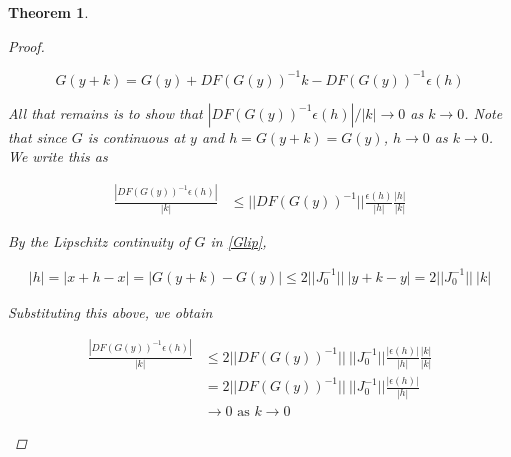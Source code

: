 \documentclass{article}
\newtheorem{theorem}{Theorem}[section]
\begin{document}
\begin{theorem}
\begin{proof}
\begin{enumerate}
\[
G(y + k) = G(y) + DF(G(y))^{-1}k - DF(G(y))^{-1}\epsilon(h)
\]

All that remains is to show that $|DF(G(y))^{-1}\epsilon(h)|/|k| \rightarrow 0$ as $k \rightarrow 0$. Note that since $G$ is continuous at $y$ and $h = G(y + k) = G(y)$, $h \rightarrow 0$ as $k \rightarrow 0$. We write this as
 
\begin{align*}
\frac{| DF(G(y))^{-1}\epsilon(h)| }{|k|} 
&\leq || DF(G(y))^{-1}|| \frac{ \epsilon(h)}{|h|}\frac{|h|}{|k|}
\end{align*}

By the Lipschitz continuity of $G$ in \eqref{Glip}, 

\begin{align*}
|h| = |x + h - x| = |G(y + k) - G(y)| \leq 2 ||J_0^{-1}|| \: |y + k - y| = 2 ||J_0^{-1}|| \: |k|
\end{align*}

Substituting this above, we obtain

\begin{align*}
\frac{| DF(G(y))^{-1}\epsilon(h)| }{|k|} 
&\leq 2 ||DF(G(y))^{-1}|| \: ||J_0^{-1}|| \frac{ |\epsilon(h)|}{|h|}\frac{|k|}{|k|} \\
&= 2 ||DF(G(y))^{-1}|| \: ||J_0^{-1}|| \frac{ |\epsilon(h)|}{|h|} \\
&\rightarrow 0 \text{ as }k \rightarrow 0
\end{align*}





\end{enumerate}
\end{proof}
\end{theorem}
\end{document}
